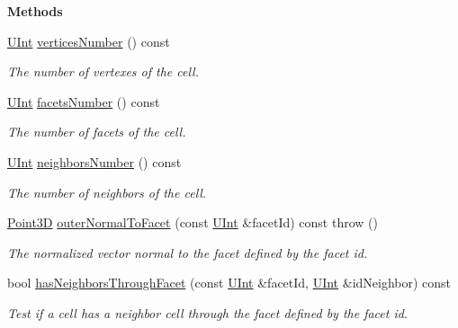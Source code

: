 \begin{Indent}{\bf Methods}\par
\begin{DoxyCompactItemize}
\item 
\hyperlink{namespaceFVCode3D_a4bf7e328c75d0fd504050d040ebe9eda}{U\+Int} \hyperlink{classFVCode3D_1_1Mesh3D_1_1Cell3D_a4877a883d7ae0abfe581809606ce260c}{vertices\+Number} () const 
\begin{DoxyCompactList}\small\item\em The number of vertexes of the cell. \end{DoxyCompactList}\item 
\hyperlink{namespaceFVCode3D_a4bf7e328c75d0fd504050d040ebe9eda}{U\+Int} \hyperlink{classFVCode3D_1_1Mesh3D_1_1Cell3D_ad50aaf8cb835953be8877e6544ddef1f}{facets\+Number} () const 
\begin{DoxyCompactList}\small\item\em The number of facets of the cell. \end{DoxyCompactList}\item 
\hyperlink{namespaceFVCode3D_a4bf7e328c75d0fd504050d040ebe9eda}{U\+Int} \hyperlink{classFVCode3D_1_1Mesh3D_1_1Cell3D_acf1a14ff007ddd8f6eee17af3335ef2c}{neighbors\+Number} () const 
\begin{DoxyCompactList}\small\item\em The number of neighbors of the cell. \end{DoxyCompactList}\item 
\hyperlink{classFVCode3D_1_1Point3D}{Point3D} \hyperlink{classFVCode3D_1_1Mesh3D_1_1Cell3D_aa5980d36b600b69686105050a4918b60}{outer\+Normal\+To\+Facet} (const \hyperlink{namespaceFVCode3D_a4bf7e328c75d0fd504050d040ebe9eda}{U\+Int} \&facet\+Id) const   throw ()
\begin{DoxyCompactList}\small\item\em The normalized vector normal to the facet defined by the facet id. \end{DoxyCompactList}\item 
bool \hyperlink{classFVCode3D_1_1Mesh3D_1_1Cell3D_ab398572491821d827c2324b340e05c10}{has\+Neighbors\+Through\+Facet} (const \hyperlink{namespaceFVCode3D_a4bf7e328c75d0fd504050d040ebe9eda}{U\+Int} \&facet\+Id, \hyperlink{namespaceFVCode3D_a4bf7e328c75d0fd504050d040ebe9eda}{U\+Int} \&id\+Neighbor) const 
\begin{DoxyCompactList}\small\item\em Test if a cell has a neighbor cell through the facet defined by the facet id. \end{DoxyCompactList}\item 

\end{DoxyCompactItemize}
\end{Indent}

